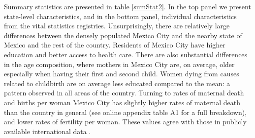 \documentclass[a4paper, 11pt]{article}
\begin{document}
\begin{spacing}{2}
Summary statistics are presented in table \ref{sumStat2}.  In the top panel we present state-level characteristics, and in the bottom panel, individual characteristics from the vital statistics registries.  Unsurprisingly, there are relatively large differences between the densely populated Mexico City and the nearby state of Mexico and the rest of the country.  Residents of Mexico City have higher education and better access to health care. There are also substantial differences in the age composition, where mothers in Mexico City are, on average, older especially when having their first and second child.  Women dying from causes related to childbirth are on average less educated compared to the mean: a pattern observed in all areas of the country.  Turning to rates of maternal death and births per woman Mexico City has slightly higher %
 rates of maternal death than the country in general (see online appendix table A1 for a full breakdown), and lower rates of fertility per woman.  These values agree with those in publicly available international data \citep{WHO2015}.%


\end{spacing}
\end{document}

